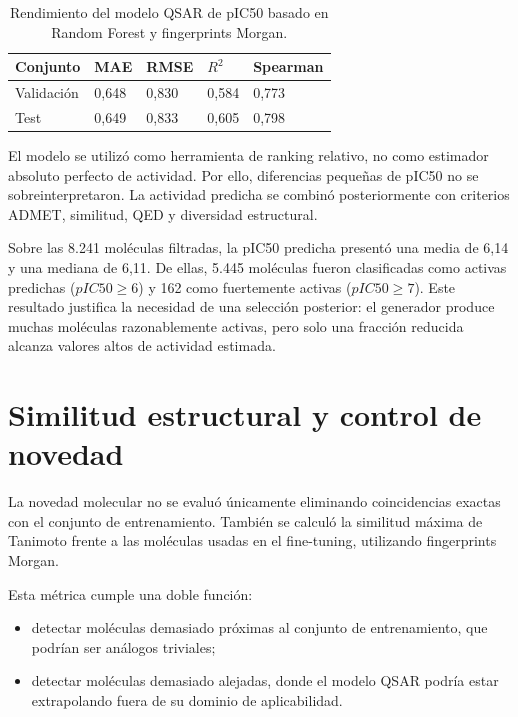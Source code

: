 \documentclass[IB]{TFUOC}%
\begin{document}
\begin{table}[H]
    \centering
    \small
    \begin{tabular}{p{3cm} p{2.5cm} p{2.5cm} p{2.5cm} p{2.5cm}}
        \hline
        \textbf{Conjunto} & \textbf{MAE} & \textbf{RMSE} & \textbf{$R^2$} & \textbf{Spearman} \\
        \hline
        Validación & 0,648 & 0,830 & 0,584 & 0,773 \\
        Test & 0,649 & 0,833 & 0,605 & 0,798 \\
        \hline
    \end{tabular}
    \caption{Rendimiento del modelo QSAR de pIC50 basado en Random Forest y fingerprints Morgan.}
    \label{tab:metricas_qsar}
\end{table}

El modelo se utilizó como herramienta de ranking relativo, no como estimador absoluto perfecto de actividad. Por ello, diferencias pequeñas de pIC50 no se sobreinterpretaron. La actividad predicha se combinó posteriormente con criterios ADMET, similitud, QED y diversidad estructural.

Sobre las 8.241 moléculas filtradas, la pIC50 predicha presentó una media de 6,14 y una mediana de 6,11. De ellas, 5.445 moléculas fueron clasificadas como activas predichas ($pIC50 \geq 6$) y 162 como fuertemente activas ($pIC50 \geq 7$). Este resultado justifica la necesidad de una selección posterior: el generador produce muchas moléculas razonablemente activas, pero solo una fracción reducida alcanza valores altos de actividad estimada.

\section{Similitud estructural y control de novedad}

La novedad molecular no se evaluó únicamente eliminando coincidencias exactas con el conjunto de entrenamiento. También se calculó la similitud máxima de Tanimoto frente a las moléculas usadas en el fine-tuning, utilizando fingerprints Morgan.

Esta métrica cumple una doble función:

\begin{itemize}
    \item detectar moléculas demasiado próximas al conjunto de entrenamiento, que podrían ser análogos triviales;
    \item detectar moléculas demasiado alejadas, donde el modelo QSAR podría estar extrapolando fuera de su dominio de aplicabilidad.
\end{itemize}
\end{document}
